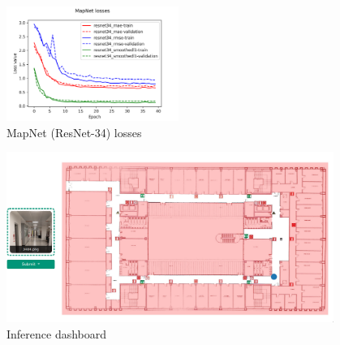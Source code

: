 \begin{figure}[h]
    \begin{center}
        \includegraphics[width=0.50\textwidth]{./imgs/mapnet_losses.png}
    \end{center}
    \caption{MapNet (ResNet-34) losses}
    \label{fig:mapnet-losses}
\end{figure}

\begin{figure}
    \begin{center}
        \includegraphics[width=0.95\textwidth]{./imgs/dashboard.png}
    \end{center}
    \caption{Inference dashboard}
    \label{fig:dashboard}
\end{figure}




